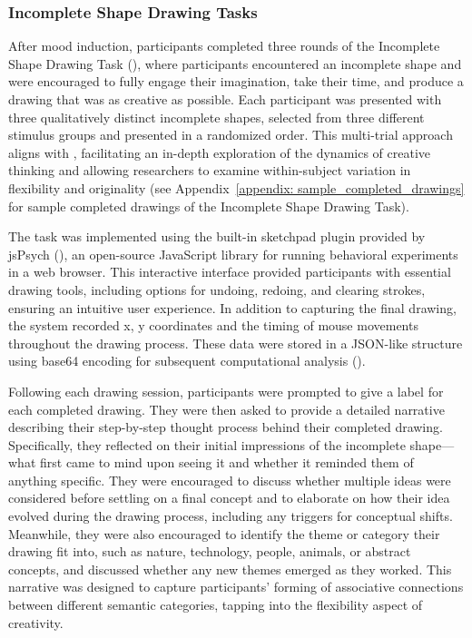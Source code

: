 \documentclass[../MA_Thesis.tex]{subfiles}
\begin{document}
\subsubsection*{Incomplete Shape Drawing Tasks}
After mood induction, participants completed three rounds of the Incomplete Shape Drawing Task (\cite{barbot_dynamics_2018}), where participants encountered an incomplete shape and were encouraged to fully engage their imagination, take their time, and produce a drawing that was as creative as possible. Each participant was presented with three qualitatively distinct incomplete shapes, selected from three different stimulus groups and presented in a randomized order. This multi-trial approach aligns with \textcite{barbot_dynamics_2018}, facilitating an in-depth exploration of the dynamics of creative thinking and allowing researchers to examine within-subject variation in flexibility and originality (see Appendix~\ref{appendix: sample_completed_drawings} for sample completed drawings of the Incomplete Shape Drawing Task). 

The task was implemented using the built-in sketchpad plugin provided by jsPsych (\cite{leeuw_jspsych_2023}), an open-source JavaScript library for running behavioral experiments in a web browser. This interactive interface provided participants with essential drawing tools, including options for undoing, redoing, and clearing strokes, ensuring an intuitive user experience. In addition to capturing the final drawing, the system recorded x, y coordinates and the timing of mouse movements throughout the drawing process. These data were stored in a JSON-like structure using base64 encoding for subsequent computational analysis (\cite{bainbridge_tutorial_2022}).

Following each drawing session, participants were prompted to give a label for each completed drawing. They were then asked to provide a detailed narrative describing their step-by-step thought process behind their completed drawing. Specifically, they reflected on their initial impressions of the incomplete shape—what first came to mind upon seeing it and whether it reminded them of anything specific. They were encouraged to discuss whether multiple ideas were considered before settling on a final concept and to elaborate on how their idea evolved during the drawing process, including any triggers for conceptual shifts. Meanwhile, they were also encouraged to identify the theme or category their drawing fit into, such as nature, technology, people, animals, or abstract concepts, and discussed whether any new themes emerged as they worked. This narrative was designed to capture participants' forming of associative connections between different semantic categories, tapping into the flexibility aspect of creativity. 
\end{document}
